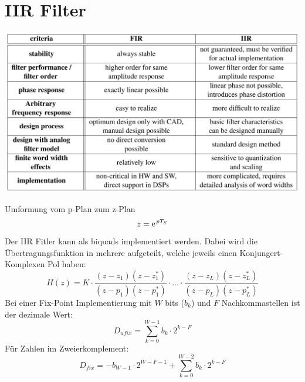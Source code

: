 \section{IIR Filter}
\begin{center}
	\includegraphics[scale=.7]{./images/fir_vs_iir}
\end{center}
Umformung vom p-Plan zum z-Plan
\[ z = \e^{pT_S} \]
Der IIR Fitler kann als biquads implementiert werden. Dabei wird die
Übertragungsfunktion in mehrere aufgeteilt, welche jeweils einen Konjungert-
Komplexen Pol haben:
\[ H(z) = K \cdot \frac{(z-z_1)(z-z_1^*)}{(z-p_1)(z-p_1^*)}\cdot\ldots\cdot
	\frac{(z-z_L)(z-z_L^*)}{(z-p_L)(z-p_L^*)} \]
Bei einer Fix-Point Implementierung mit $W$ bits ($b_k$) und $F$ Nachkommastellen ist
der dezimale Wert:
\[ D_{ufix} = \sum_{k=0}^{W-1}b_k \cdot 2^{k-F} \]
Für Zahlen im Zweierkomplement:
\[ D_{fix} = -b_{W-1} \cdot 2^{W-F-1} + \sum_{k=0}^{W-2} b_k \cdot 2^{k-F} \]